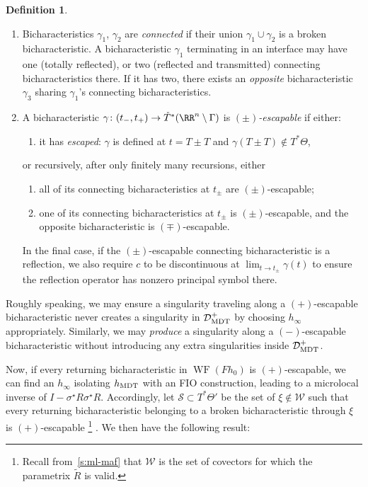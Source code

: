 \documentclass[10pt]{article}
\theoremstyle{plain}
\theoremstyle{definition}
\newtheorem*{defn}{Definition}
\theoremstyle{remark}
\numberwithin{theorem}{section}
\numberwithin{example}{section}
\numberwithin{equation}{section}
\numberwithin{figure}{section}
\newcommand\sref[1]{\textsection\ref{#1}}					%
\newcommand\To{\smash{\mathring T}\vphantom{T}}			%
\DeclareMathOperator\WF{WF}		%
\newcommand\MDT{\ensuremath{_{\text{\normalfont MDT}}}}	%
\begin{document}
\begin{defn}
\begin{enumerate}
		\item Bicharacteristics $\gamma_1$, $\gamma_2$ are \emph{connected} if their union $\gamma_1\cup\gamma_2$ is a broken bicharacteristic. A bicharacteristic $\gamma_1$ terminating in an interface may have one (totally reflected), or two (reflected and transmitted) connecting bicharacteristics there. If it has two, there exists an \emph{opposite} bicharacteristic $\gamma_3$ sharing $\gamma_1$'s connecting bicharacteristics.
		\item A bicharacteristic $\gamma\colon(t_-,t_+)\to\To^*(\RR^n\setminus\Gamma)$ is \emph{$(\pm)$-escapable} if either:
		\begin{enumerate}
			\item it has \emph{escaped}: $\gamma$ is defined at $t=T\pm T$ and $\gamma(T\pm T)\notin T^*\Theta$,
		\end{enumerate}
		or recursively, after only finitely many recursions, either
		\begin{enumerate}
			\item all of its connecting bicharacteristics at $t_\pm$ are $(\pm)$-escapable;
			\item one of its connecting bicharacteristics at $t_\pm$ is $(\pm)$-escapable, and the opposite bicharacteristic is $(\mp)$-escapable.
		\end{enumerate}
		In the final case, if the $(\pm)$-escapable connecting bicharacteristic is a reflection, we also require $c$ to be discontinuous at $\lim_{t\to t_\pm}\gamma(t)$ to ensure the reflection operator has nonzero principal symbol there.
	\end{enumerate}
\end{defn}

Roughly speaking, we may ensure a singularity traveling along a $(+)$-escapable bicharacteristic never creates a singularity in $\mathcal D^+\MDT$ by choosing $h_\infty$ appropriately. Similarly, we may \emph{produce} a singularity along a $(-)$-escapable bicharacteristic without introducing any extra singularities inside $\mathcal D^+\MDT$.

Now, if every returning bicharacteristic in $\WF(Fh_0)$ is $(+)$-escapable, we can find an $h_\infty$ isolating $h\MDT$ with an FIO construction, leading to a microlocal inverse of $I-\sigma^\star R\sigma^\star R$. Accordingly, let $\mathcal S\subset T^*\Theta'$ be the set of $\xi\notin\mathcal W$ such that every returning bicharacteristic belonging to a broken bicharacteristic through $\xi$ is $(+)$-escapable%
\footnote{Recall from~\sref{s:ml-maf} that $\mathcal W$ is the set of covectors for which the parametrix $\tilde R$ is valid.}%
. We then have the following result:
\end{document}
